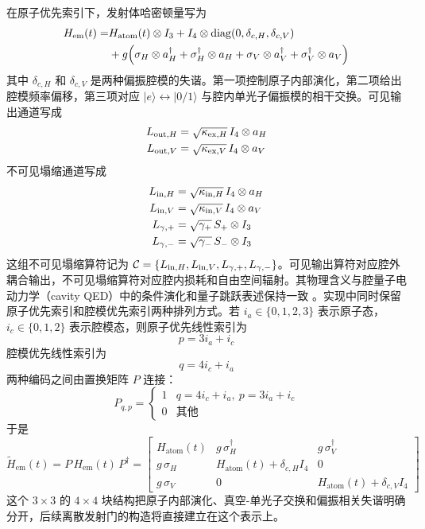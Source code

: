 在原子优先索引下，发射体哈密顿量写为
\begin{align}
H_{\mathrm{em}}(t)=&
H_{\mathrm{atom}}(t)\otimes I_3 + I_4\otimes \mathrm{diag}(0,\delta_{c,H},\delta_{c,V})\notag\\
&+g\Bigl(
\sigma_H\otimes a_H^\dagger+\sigma_H^\dagger\otimes a_H
+\sigma_V\otimes a_V^\dagger+\sigma_V^\dagger\otimes a_V
\Bigr)
\label{eq:emitter-hamiltonian-12d}
\end{align}
其中 $\delta_{c,H}$ 和 $\delta_{c,V}$ 是两种偏振腔模的失谐。第一项控制原子内部演化，第二项给出腔模频率偏移，第三项对应 $|e\rangle \leftrightarrow |0/1\rangle$ 与腔内单光子偏振模的相干交换。可见输出通道写成
\begin{align}
L_{{\rm out},H} &= \sqrt{\kappa_{{\rm ex},H}}\,I_4\otimes a_H\\
L_{{\rm out},V} &= \sqrt{\kappa_{{\rm ex},V}}\,I_4\otimes a_V
\end{align}
不可见塌缩通道写成
\begin{align}
L_{{\rm in},H} &= \sqrt{\kappa_{{\rm in},H}}\,I_4\otimes a_H\\
L_{{\rm in},V} &= \sqrt{\kappa_{{\rm in},V}}\,I_4\otimes a_V\\
L_{\gamma,+} &= \sqrt{\gamma_+}\,S_+\otimes I_3\\
L_{\gamma,-} &= \sqrt{\gamma_-}\,S_-\otimes I_3
\end{align}
这组不可见塌缩算符记为 $\mathcal{C}=\{L_{{\rm in},H},L_{{\rm in},V},L_{\gamma,+},L_{\gamma,-}\}$。可见输出算符对应腔外耦合输出，不可见塌缩算符对应腔内损耗和自由空间辐射。其物理含义与腔量子电动力学（cavity QED）中的条件演化和量子跳跃表述保持一致 \cite{Carmichael1993OpenSystemsQuantumOptics,PlenioKnight1998QuantumJumps}。实现中同时保留原子优先索引和腔模优先索引两种排列方式。若 $i_a\in\{0,1,2,3\}$ 表示原子态，$i_c\in\{0,1,2\}$ 表示腔模态，则原子优先线性索引为
\begin{equation}
p=3i_a+i_c
\label{eq:app-index-atom-major}
\end{equation}
腔模优先线性索引为
\begin{equation}
q=4i_c+i_a
\label{eq:app-index-cavity-major}
\end{equation}
两种编码之间由置换矩阵 $P$ 连接：
\begin{equation}
P_{q,p}=
\begin{cases}
1 & q=4i_c+i_a,\ p=3i_a+i_c\\
0 & \text{其他}
\end{cases}
\label{eq:app-perm}
\end{equation}
于是
\begin{equation}
\tilde H_{\mathrm{em}}(t)=P\,H_{\mathrm{em}}(t)\,P^\dagger
=
\begin{bmatrix}
H_{\mathrm{atom}}(t) & g\,\sigma_H^\dagger & g\,\sigma_V^\dagger\\
g\,\sigma_H & H_{\mathrm{atom}}(t)+\delta_{c,H}I_4 & 0\\
g\,\sigma_V & 0 & H_{\mathrm{atom}}(t)+\delta_{c,V}I_4
\end{bmatrix}
\label{eq:hem-12d-block4}
\end{equation}
这个 $3\times3$ 的 $4\times4$ 块结构把原子内部演化、真空-单光子交换和偏振相关失谐明确分开，后续离散发射门的构造将直接建立在这个表示上。

